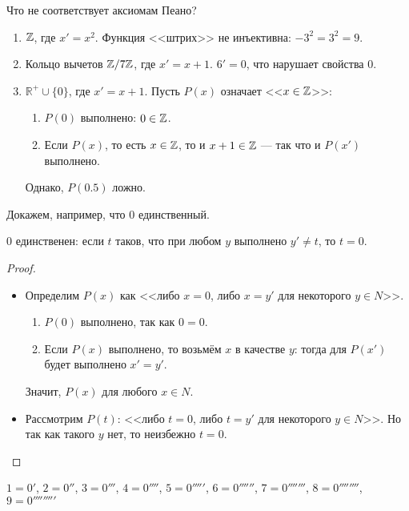 \begin{example}
    Что не соответствует аксиомам Пеано?
\begin{enumerate}
\item $\mathbb{Z}$, где $x' = x^2$. Функция <<штрих>> не инъективна: $-3^2 = 3^2 = 9$.

\item Кольцо вычетов $\mathbb{Z}/{7\mathbb{Z}}$, где $x' = x+1$. $6' = 0$, что нарушает свойства $0$.

\item $\mathbb{R^+}\cup\{0\}$, где $x' = x+1$. Пусть $P(x)$ означает <<$x \in \mathbb{Z}$>>: \begin{enumerate}
\item $P(0)$ выполнено: $0 \in \mathbb{Z}$.
\item Если $P(x)$, то есть $x \in \mathbb{Z}$, то и $x+1 \in \mathbb{Z}$ --- так
что и $P(x')$ выполнено.
\end{enumerate}
Однако, $P(0.5)$ ложно.
\end{enumerate}
\end{example}

Докажем, например, что 0 единственный.
\begin{theorem}
    0 единственен: если $t$ таков, что при любом $y$
выполнено $y' \ne t$, то $t = 0$.
\end{theorem}
\begin{proof}

\begin{itemize}
    \item Определим $P(x)$ как <<либо $x = 0$, либо $x = y'$ для некоторого $y \in N$>>.
    \begin{enumerate}
        \item $P(0)$ выполнено, так как $0 = 0$.
        \item Если $P(x)$ выполнено, то возьмём $x$ в качестве $y$: тогда для $P(x')$ будет выполнено $x' = y'$.
    \end{enumerate}
Значит, $P(x)$ для любого $x \in N$.

\item Рассмотрим $P(t)$: <<либо $t = 0$, либо $t = y'$ для некоторого $y \in N$>>.
Но так как такого $y$ нет, то неизбежно $t = 0$.
\end{itemize}
\end{proof}

\begin{definition}
$1 = 0'$, $2 = 0''$, $3 = 0'''$, $4 = 0''''$, $5 = 0'''''$, $6 = 0''''''$,
$7 = 0'''''''$, $8 = 0''''''''$, $9 = 0'''''''''$
\end{definition}


